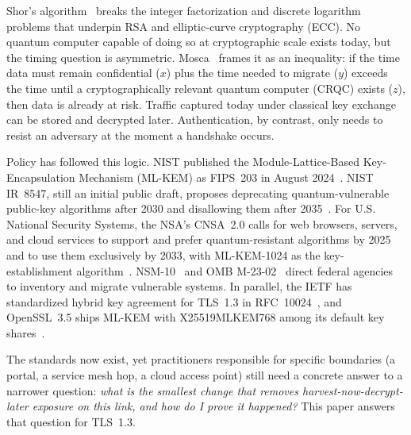 \documentclass[conference]{IEEEtran}
\begin{document}
Shor's algorithm~\cite{shor1994} breaks the integer factorization and discrete logarithm problems that underpin RSA and elliptic-curve cryptography (ECC). No quantum computer capable of doing so at cryptographic scale exists today, but the timing question is asymmetric. Mosca~\cite{mosca2018} frames it as an inequality: if the time data must remain confidential ($x$) plus the time needed to migrate ($y$) exceeds the time until a cryptographically relevant quantum computer (CRQC) exists ($z$), then data is already at risk. Traffic captured today under classical key exchange can be stored and decrypted later. Authentication, by contrast, only needs to resist an adversary at the moment a handshake occurs.

Policy has followed this logic. NIST published the Module-Lattice-Based Key-Encapsulation Mechanism (ML-KEM) as FIPS~203 in August 2024~\cite{fips203}. NIST IR~8547, still an initial public draft, proposes deprecating quantum-vulnerable public-key algorithms after 2030 and disallowing them after 2035~\cite{nistir8547}. For U.S. National Security Systems, the NSA's CNSA~2.0 calls for web browsers, servers, and cloud services to support and prefer quantum-resistant algorithms by 2025 and to use them exclusively by 2033, with ML-KEM-1024 as the key-establishment algorithm~\cite{cnsa2}. NSM-10~\cite{nsm10} and OMB M-23-02~\cite{omb2302} direct federal agencies to inventory and migrate vulnerable systems. In parallel, the IETF has standardized hybrid key agreement for TLS~1.3 in RFC~10024~\cite{rfc10024}, and OpenSSL~3.5 ships ML-KEM with X25519MLKEM768 among its default key shares~\cite{openssl35}.

The standards now exist, yet practitioners responsible for specific boundaries (a portal, a service mesh hop, a cloud access point) still need a concrete answer to a narrower question: \emph{what is the smallest change that removes harvest-now-decrypt-later exposure on this link, and how do I prove it happened?} This paper answers that question for TLS~1.3.
\end{document}
